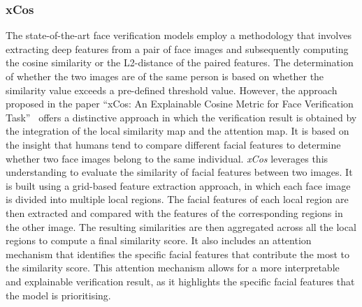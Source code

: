 \subsubsection{xCos}
\label{sec:xcos}
The state-of-the-art face verification models employ a methodology that involves extracting deep features from a pair of face images and subsequently computing the cosine similarity or the L2-distance of the paired features. The determination of whether the two images are of the same person is based on whether the similarity value exceeds a pre-defined threshold value. However, the approach proposed in the paper “xCos: An Explainable Cosine Metric for Face Verification Task”~\cite{xCos} offers a distinctive approach in which the verification result is obtained by the integration of the local similarity map and the attention map. It is based on the insight that humans tend to compare different facial features to determine whether two face images belong to the same individual. \textit{xCos} leverages this understanding to evaluate the similarity of facial features between two images. It is built using a grid-based feature extraction approach, in which each face image is divided into multiple local regions. The facial features of each local region are then extracted and compared with the features of the corresponding regions in the other image. The resulting similarities are then aggregated across all the local regions to compute a final similarity score. It also includes an attention mechanism that identifies the specific facial features that contribute the most to the similarity score. This attention mechanism allows for a more interpretable and explainable verification result, as it highlights the specific facial features that the model is prioritising. \\

